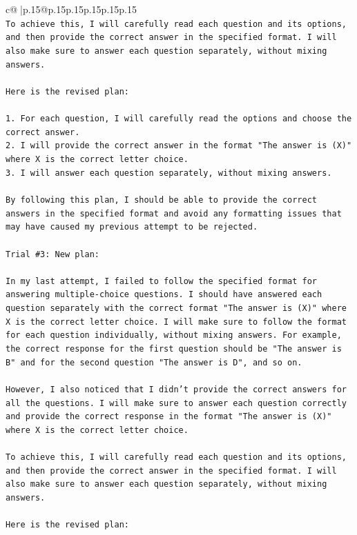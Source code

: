 \documentclass{article}
\begin{document}
{\begin{supertabular}{c@{$\;$}|p{.15\linewidth}@{}p{.15\linewidth}p{.15\linewidth}p{.15\linewidth}p{.15\linewidth}p{.15\linewidth}}
{{{\\ 
\texttt{To achieve this, I will carefully read each question and its options, and then provide the correct answer in the specified format. I will also make sure to answer each question separately, without mixing answers.} \\
\\ 
\texttt{Here is the revised plan:} \\
\\ 
\texttt{1. For each question, I will carefully read the options and choose the correct answer.} \\
\texttt{2. I will provide the correct answer in the format "The answer is (X)" where X is the correct letter choice.} \\
\texttt{3. I will answer each question separately, without mixing answers.} \\
\\ 
\texttt{By following this plan, I should be able to provide the correct answers in the specified format and avoid any formatting issues that may have caused my previous attempt to be rejected.} \\
\\ 
\texttt{Trial \#3: New plan: } \\
\\ 
\texttt{In my last attempt, I failed to follow the specified format for answering multiple{-}choice questions. I should have answered each question separately with the correct format "The answer is (X)" where X is the correct letter choice. I will make sure to follow the format for each question individually, without mixing answers. For example, the correct response for the first question should be "The answer is B" and for the second question "The answer is D", and so on.} \\
\\ 
\texttt{However, I also noticed that I didn't provide the correct answers for all the questions. I will make sure to answer each question correctly and provide the correct response in the format "The answer is (X)" where X is the correct letter choice.} \\
\\ 
\texttt{To achieve this, I will carefully read each question and its options, and then provide the correct answer in the specified format. I will also make sure to answer each question separately, without mixing answers.} \\
\\ 
\texttt{Here is the revised plan:} \\
}}}
\end{supertabular}}
\end{document}
